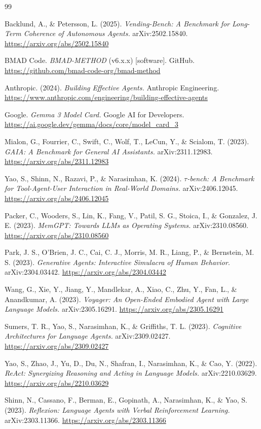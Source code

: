 \documentclass[11pt]{article}
\begin{document}
\begin{thebibliography}{99}

 Backlund, A., \& Petersson, L. (2025).
\emph{Vending-Bench: A Benchmark for Long-Term Coherence of Autonomous Agents.}
arXiv:2502.15840. \url{https://arxiv.org/abs/2502.15840}

 BMAD Code. \emph{BMAD-METHOD} (v6.x.x) [software]. GitHub.
\url{https://github.com/bmad-code-org/bmad-method}

 Anthropic. (2024). \emph{Building Effective Agents.}
Anthropic Engineering.
\url{https://www.anthropic.com/engineering/building-effective-agents}

 Google. \emph{Gemma 3 Model Card.} Google AI for Developers.
\url{https://ai.google.dev/gemma/docs/core/model_card_3}

 Mialon, G., Fourrier, C., Swift, C., Wolf, T., LeCun, Y., \&
Scialom, T. (2023). \emph{GAIA: A Benchmark for General AI Assistants.}
arXiv:2311.12983. \url{https://arxiv.org/abs/2311.12983}

 Yao, S., Shinn, N., Razavi, P., \& Narasimhan, K. (2024).
\emph{$\tau$-bench: A Benchmark for Tool-Agent-User Interaction in Real-World
Domains.} arXiv:2406.12045. \url{https://arxiv.org/abs/2406.12045}

 Packer, C., Wooders, S., Lin, K., Fang, V., Patil, S. G.,
Stoica, I., \& Gonzalez, J. E. (2023). \emph{MemGPT: Towards LLMs as Operating
Systems.} arXiv:2310.08560. \url{https://arxiv.org/abs/2310.08560}

 Park, J. S., O'Brien, J. C., Cai, C. J., Morris, M. R.,
Liang, P., \& Bernstein, M. S. (2023). \emph{Generative Agents: Interactive
Simulacra of Human Behavior.} arXiv:2304.03442.
\url{https://arxiv.org/abs/2304.03442}

 Wang, G., Xie, Y., Jiang, Y., Mandlekar, A., Xiao, C., Zhu,
Y., Fan, L., \& Anandkumar, A. (2023). \emph{Voyager: An Open-Ended Embodied
Agent with Large Language Models.} arXiv:2305.16291.
\url{https://arxiv.org/abs/2305.16291}

 Sumers, T. R., Yao, S., Narasimhan, K., \& Griffiths, T. L.
(2023). \emph{Cognitive Architectures for Language Agents.} arXiv:2309.02427.
\url{https://arxiv.org/abs/2309.02427}

 Yao, S., Zhao, J., Yu, D., Du, N., Shafran, I., Narasimhan, K.,
\& Cao, Y. (2022). \emph{ReAct: Synergizing Reasoning and Acting in Language
Models.} arXiv:2210.03629. \url{https://arxiv.org/abs/2210.03629}

 Shinn, N., Cassano, F., Berman, E., Gopinath, A.,
Narasimhan, K., \& Yao, S. (2023). \emph{Reflexion: Language Agents with Verbal
Reinforcement Learning.} arXiv:2303.11366.
\url{https://arxiv.org/abs/2303.11366}

\end{thebibliography}
\end{document}

